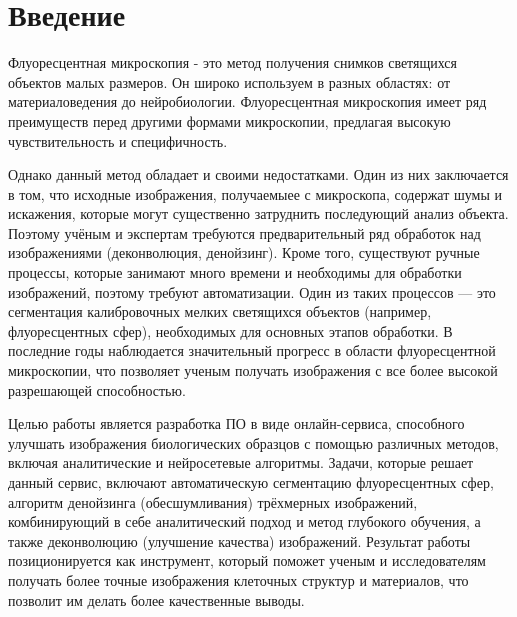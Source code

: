 \chapter*{Введение} %
\par Флуоресцентная микроскопия - это метод получения снимков светящихся объектов малых размеров. Он широко используем в разных областях: от материаловедения до нейробиологии. Флуоресцентная микроскопия имеет ряд преимуществ перед другими формами микроскопии, предлагая высокую чувствительность и специфичность. 
\par Однако данный метод обладает и своими недостатками. Один из них заключается в том, что исходные изображения, получаемыее с микроскопа, содержат шумы и искажения, которые могут существенно затруднить последующий анализ объекта. Поэтому учёным и экспертам требуются предварительный ряд обработок над изображениями (деконволюция, денойзинг). Кроме того, существуют ручные процессы, которые занимают много времени и необходимы для обработки изображений, поэтому требуют автоматизации. Один из таких процессов — это сегментация калибровочных мелких светящихся объектов (например, флуоресцентных сфер), необходимых для основных этапов обработки. В последние годы наблюдается значительный прогресс в области флуоресцентной микроскопии, что позволяет ученым получать изображения с все более высокой разрешающей способностью.  
\par Целью работы является разработка ПО в виде онлайн-сервиса, способного улучшать изображения биологических образцов с помощью различных методов, включая аналитические и нейросетевые алгоритмы. Задачи, которые решает данный сервис, включают автоматическую сегментацию флуоресцентных сфер, алгоритм денойзинга (обесшумливания) трёхмерных изображений, комбинирующий в себе аналитический подход и метод глубокого обучения, а также деконволюцию (улучшение качества) изображений. Результат работы позиционируется как инструмент, который поможет ученым и исследователям получать более точные изображения клеточных структур и материалов, что позволит им делать более качественные выводы.



